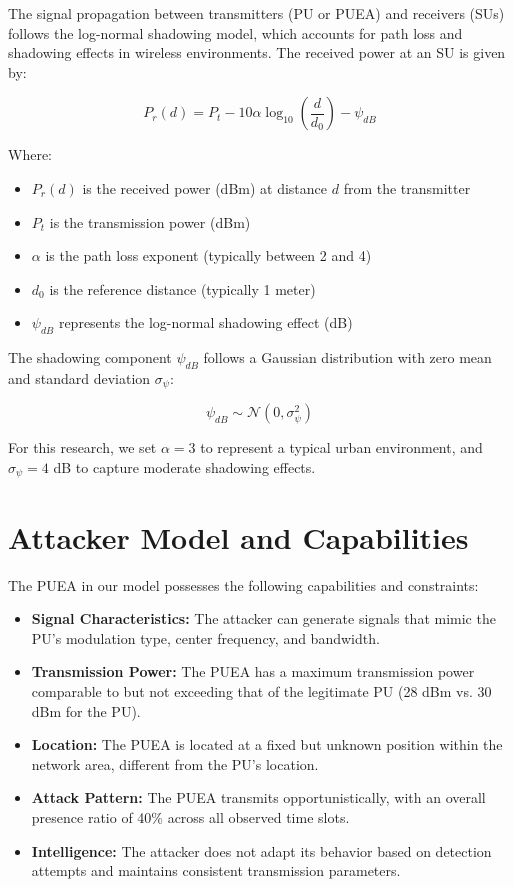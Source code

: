 The signal propagation between transmitters (PU or PUEA) and receivers (SUs) follows the log-normal shadowing model, which accounts for path loss and shadowing effects in wireless environments. The received power at an SU is given by:

\begin{equation}
    P_r(d) = P_t - 10\alpha\log_{10}\left(\frac{d}{d_0}\right) - \psi_{dB}
\end{equation}

Where:
\begin{itemize}
    \item $P_r(d)$ is the received power (dBm) at distance $d$ from the transmitter
    \item $P_t$ is the transmission power (dBm)
    \item $\alpha$ is the path loss exponent (typically between 2 and 4)
    \item $d_0$ is the reference distance (typically 1 meter)
    \item $\psi_{dB}$ represents the log-normal shadowing effect (dB)
\end{itemize}

The shadowing component $\psi_{dB}$ follows a Gaussian distribution with zero mean and standard deviation $\sigma_{\psi}$:

\begin{equation}
    \psi_{dB} \sim \mathcal{N}(0, \sigma_{\psi}^2)
\end{equation}

For this research, we set $\alpha = 3$ to represent a typical urban environment, and $\sigma_{\psi} = 4$ dB to capture moderate shadowing effects.

\section{Attacker Model and Capabilities}

The PUEA in our model possesses the following capabilities and constraints:

\begin{itemize}
    \item \textbf{Signal Characteristics:} The attacker can generate signals that mimic the PU's modulation type, center frequency, and bandwidth.
    
    \item \textbf{Transmission Power:} The PUEA has a maximum transmission power comparable to but not exceeding that of the legitimate PU (28 dBm vs. 30 dBm for the PU).
    
    \item \textbf{Location:} The PUEA is located at a fixed but unknown position within the network area, different from the PU's location.
    
    \item \textbf{Attack Pattern:} The PUEA transmits opportunistically, with an overall presence ratio of 40\% across all observed time slots.
    
    \item \textbf{Intelligence:} The attacker does not adapt its behavior based on detection attempts and maintains consistent transmission parameters.
\end{itemize}

